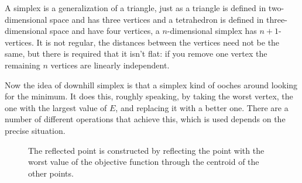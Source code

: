 \documentclass[11pt,a4paper]{scrartcl}
\begin{document}
A simplex is a generalization of a triangle, just as a triangle is
defined in two-dimensional space and has three vertices and a
tetrahedron is defined in three-dimensional space and have four
vertices, a $n$-dimensional simplex has $n+1$-vertices. It is not
regular, the distances between the vertices need not be the same, but
there is required that it isn't flat: if you remove one vertex the
remaining $n$ vertices are linearly independent.

Now the idea of downhill simplex is that a simplex kind of ooches
around looking for the minimum. It does this, roughly speaking, by
taking the worst vertex, the one with the largest value of $E$, and
replacing it with a better one. There are a number of different
operations that achieve this, which is used depends on the precise
situation.


\begin{figure}
\begin{center}

\end{center}
\caption{The reflected point is constructed by reflecting the point
  with the worst value of the objective function through the centroid
  of the other points.\label{fig:reflection}}
\end{figure}
\end{document}
